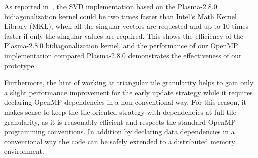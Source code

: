 As reported in~\cite{haidar2013improved},
the SVD implementation based on the
Plasma-2.8.0 bidiagonalization kernel could be two times faster than
Intel’s Math Kernel Library (MKL), when all the singular vectors are
requested and up to 10 times faster if only the singular values are
required. This shows the efficiency of the Plasma-2.8.0 bidiagonalization
kernel, and the performance of our OpenMP implementation
compared Plasma-2.8.0 demonstrates the effectiveness of our prototype.

Furthermore, the hint of working at triangular tile granularity helps
to gain only a slight performance improvement for the early update
strategy while it requires declaring OpenMP dependencies in a
non-conventional way. For this reason, it makes sense to keep the tile
oriented strategy with dependencies at full tile granularity,
as it is reasonably efficient and respects the standard OpenMP programming
conventions.
In addition by declaring data dependencies in a conventional
way the code can be safely extended to a distributed memory environment.
